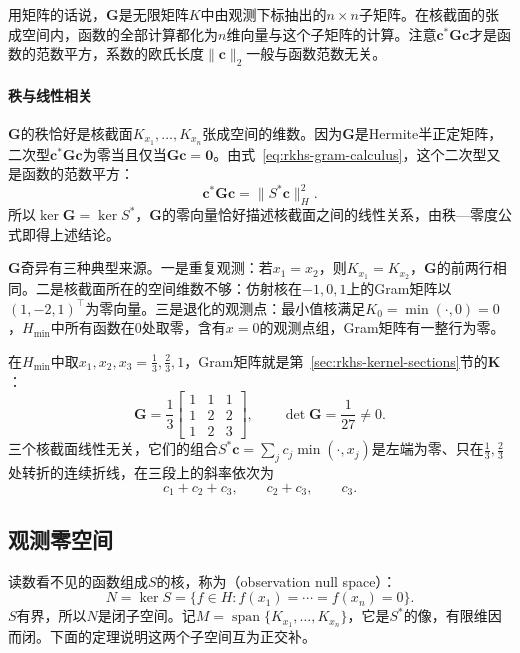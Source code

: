 用矩阵的话说，$\bm G$是无限矩阵$K$中由观测下标抽出的$n\times n$子矩阵。在核截面的张成空间内，函数的全部计算都化为$n$维向量与这个子矩阵的计算。注意$\bm c^*\bm G\bm c$才是函数的范数平方，系数的欧氏长度$\lVert\bm c\rVert_2$一般与函数范数无关。

\paragraph{秩与线性相关}

$\bm G$的秩恰好是核截面$K_{x_1},\ldots,K_{x_n}$张成空间的维数。因为$\bm G$是Hermite半正定矩阵，二次型$\bm c^*\bm G\bm c$为零当且仅当$\bm G\bm c=\bm 0$。由式~\eqref{eq:rkhs-gram-calculus}，这个二次型又是函数的范数平方：
\[
\bm c^*\bm G\bm c=\lVert S^*\bm c\rVert_H^2 .
\]
所以$\ker\bm G=\ker S^*$，$\bm G$的零向量恰好描述核截面之间的线性关系，由秩—零度公式即得上述结论。

$\bm G$奇异有三种典型来源。一是重复观测：若$x_1=x_2$，则$K_{x_1}=K_{x_2}$，$\bm G$的前两行相同。二是核截面所在的空间维数不够：仿射核在$-1,0,1$上的Gram矩阵以$(1,-2,1)^{\top}$为零向量。三是退化的观测点：最小值核满足$K_0=\min(\cdot,0)=0$，$H_{\min}$中所有函数在$0$处取零，含有$x=0$的观测点组，Gram矩阵有一整行为零。

\begin{example}[最小值核的观测映射]
\label{ex:rkhs-hmin-observation}
在$H_{\min}$中取$x_1,x_2,x_3=\tfrac13,\tfrac23,1$，Gram矩阵就是第~\ref{sec:rkhs-kernel-sections}节的$\bm K$：
\[
\bm G=\frac13\begin{bmatrix}1&1&1\\1&2&2\\1&2&3\end{bmatrix},\qquad
\det\bm G=\frac1{27}\neq0 .
\]
三个核截面线性无关，它们的组合$S^*\bm c=\sum_jc_j\min(\cdot,x_j)$是左端为零、只在$\tfrac13,\tfrac23$处转折的连续折线，在三段上的斜率依次为
\[
c_1+c_2+c_3,\qquad c_2+c_3,\qquad c_3 .
\]
\end{example}

\subsection{观测零空间}
\label{sec:rkhs-observation-null-space}

读数看不见的函数组成$S$的核，称为（observation null space）：
\begin{equation}
N=\ker S=\{f\in H:f(x_1)=\cdots=f(x_n)=0\}.
\label{eq:rkhs-observation-null-space}
\end{equation}
$S$有界，所以$N$是闭子空间。记$M=\operatorname{span}\{K_{x_1},\ldots,K_{x_n}\}$，它是$S^*$的像，有限维因而闭。下面的定理说明这两个子空间互为正交补。

